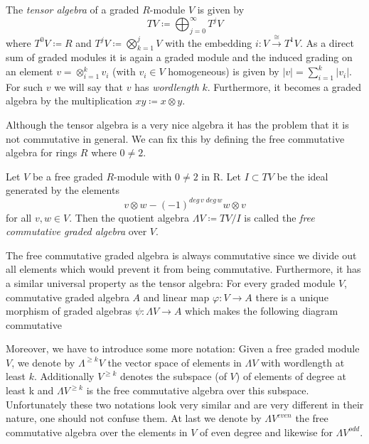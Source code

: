 \begin{Definition}
 The \emph{tensor algebra} of a graded $R$-module $V$ is given by
 $$ TV \coloneqq \bigoplus_{j = 0}^\infty T^j V$$
 where $T^0 V \coloneqq R$ and $T^j V \coloneqq \bigotimes_{k=1}^j V$ with the embedding 
 $i \colon V \overset{\cong}{\to} T^1 V$. \newline
 As a direct sum of graded modules it is again a graded module and the induced grading on an element
 $ v = \otimes_{i = 1}^k v_i $ (with $v_i \in V$ homogeneous) is given by $ |v| = \sum_{ i = 1}^k |v_i|$.
 For such $v$ we will say that $v$ has \emph{wordlength} $k$.
 Furthermore, it becomes a graded algebra by the multiplication $xy \coloneqq x \otimes y$.
\end{Definition}

Although the tensor algebra is a very nice algebra it has the problem that it is not commutative in general. We can fix this by
defining the free commutative algebra for rings $R$ where $0 \neq 2$.

\begin{Definition}
 Let $V$ be a free graded $R$-module with $0 \neq 2$ in R. Let $I \subset TV$ be the ideal generated by the elements
 $$ v \otimes w - (-1)^{deg \, v \; deg \, w} w \otimes v$$
 for all $v,w \in V$. Then the quotient algebra $ \Lambda V \coloneqq TV/I$ is called the \emph{free commutative graded algebra} over $V$.
\end{Definition}

The free commutative graded algebra is always commutative since we divide out all elements which would prevent it 
from being commutative. Furthermore, it has a similar universal property as the tensor algebra: For every graded
module $V$, commutative graded algebra $A$ and linear map $\varphi \colon V \to A$ there is a unique morphism of
graded algebras $\psi \colon \Lambda V \to A$ which makes the following diagram commutative

 

\centerline{
}



Moreover, we have to introduce some more notation: Given a free graded module $V$, we denote 
by $\Lambda^{\geq k} V$ the vector space of elements in $\Lambda V$ with wordlength at least $k$.
Additionally $V^{\geq k}$ denotes the subspace (of $V$) of elements of degree at least k and ${\Lambda V}^{\geq k}$ 
is the free commutative algebra over this subspace. Unfortunately these two notations look 
very similar and are very different in their nature, one should not confuse them.
At last we denote by $\Lambda V^{even}$ the free commutative algebra over the elements in $V$ of even degree
and likewise for $\Lambda V^{odd}$.
\par

